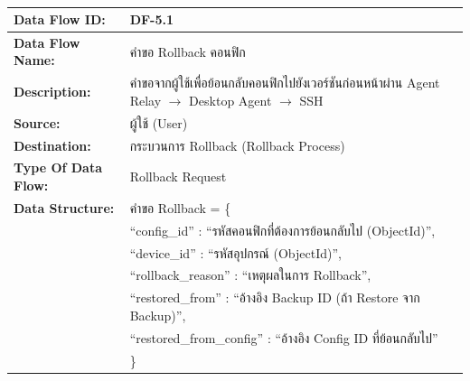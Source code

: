 \begin{table}[H]
    \caption{}
    \label{tab:df-5-1}
    \fontSixTeen 
    \begin{tabularx}{\textwidth}{|l|L|} 
        \hline
        \textbf{Data Flow ID:} & DF-5.1 \\
        \hline
        \textbf{Data Flow Name:} & คำขอ Rollback คอนฟิก \\
        \hline
        \textbf{Description:} & คำขอจากผู้ใช้เพื่อย้อนกลับคอนฟิกไปยังเวอร์ชันก่อนหน้าผ่าน Agent Relay $\rightarrow$ Desktop Agent $\rightarrow$ SSH \\
        \hline
        \textbf{Source:} & ผู้ใช้ (User) \\
        \hline
        \textbf{Destination:} & กระบวนการ Rollback (Rollback Process) \\
        \hline
        \textbf{Type Of Data Flow:} & Rollback Request \\
        \hline
        \textbf{Data Structure:} & คำขอ Rollback = \{ \nonumber \\
                        & \hspace{1em} ``config\_id'' : ``รหัสคอนฟิกที่ต้องการย้อนกลับไป (ObjectId)'', \nonumber \\
                        & \hspace{1em} ``device\_id'' : ``รหัสอุปกรณ์ (ObjectId)'', \nonumber \\
                        & \hspace{1em} ``rollback\_reason'' : ``เหตุผลในการ Rollback'', \nonumber \\
                        & \hspace{1em} ``restored\_from'' : ``อ้างอิง Backup ID (ถ้า Restore จาก Backup)'', \nonumber \\
                        & \hspace{1em} ``restored\_from\_config'' : ``อ้างอิง Config ID ที่ย้อนกลับไป'' \nonumber \\
                        & \} \\
        \hline
    \end{tabularx}
\end{table}

